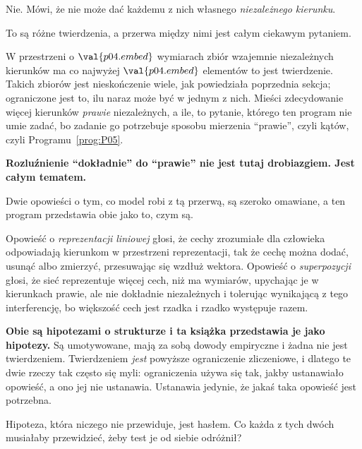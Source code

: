 \begin{fr}
\begin{ansblock}
Nie. Mówi, że nie może dać każdemu z nich własnego \emph{niezależnego
kierunku}.
\end{ansblock}

To są różne twierdzenia, a przerwa między nimi jest całym ciekawym pytaniem.

W przestrzeni o $\val{p04.embed}$ wymiarach zbiór wzajemnie niezależnych
kierunków ma co najwyżej $\val{p04.embed}$ elementów \dash{} to jest
twierdzenie. Takich zbiorów jest nieskończenie wiele, jak powiedziała
poprzednia sekcja; ograniczone jest to, ilu naraz może być w jednym z nich.
Mieści zdecydowanie więcej kierunków \emph{prawie} niezależnych, a
ile, to pytanie, którego ten program nie umie zadać, bo zadanie go potrzebuje
sposobu mierzenia \enquote{prawie}, czyli kątów, czyli
Programu~\ref{prog:P05}.

\textbf{Rozluźnienie \enquote{dokładnie} do \enquote{prawie} nie jest tutaj
drobiazgiem. Jest całym tematem.}
\end{fr}

\begin{fr}
Dwie opowieści o tym, co model robi z tą przerwą, są szeroko omawiane, a ten
program przedstawia obie jako to, czym są.

Opowieść o \emph{reprezentacji liniowej} głosi, że cechy zrozumiałe dla
człowieka odpowiadają kierunkom w przestrzeni reprezentacji, tak że cechę można
dodać, usunąć albo zmierzyć, przesuwając się wzdłuż wektora. Opowieść o
\emph{superpozycji} głosi, że sieć reprezentuje więcej cech, niż ma wymiarów,
upychając je w kierunkach prawie, ale nie dokładnie niezależnych i tolerując
wynikającą z tego interferencję, bo większość cech jest rzadka i rzadko
występuje razem.

\begin{warning}
\textbf{Obie są hipotezami o strukturze i ta książka przedstawia je jako
hipotezy.} Są umotywowane, mają za sobą dowody empiryczne i żadna nie jest
twierdzeniem. Twierdzeniem \emph{jest} powyższe ograniczenie zliczeniowe, i
dlatego te dwie rzeczy tak często się myli: ograniczenia używa się tak, jakby
ustanawiało opowieść, a ono jej nie ustanawia. Ustanawia jedynie, że jakaś taka
opowieść jest potrzebna.
\end{warning}

Hipoteza, która niczego nie przewiduje, jest hasłem. Co każda z tych dwóch
musiałaby przewidzieć, żeby test je od siebie odróżnił?
\nextframe
\end{fr}


